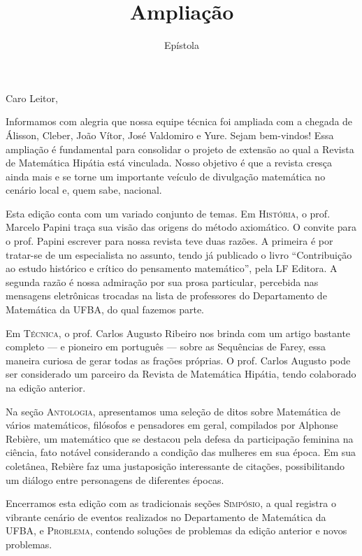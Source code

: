 \documentclass[onecolumn]{hipatia}
\title{Ampliação}
\subtitle{Epístola}
\author{}
\begin{document}
\setcounter{page}{\epistolapage}
\maketitle
\leftskip=2.5cm
\rightskip=2.5cm


\noindent Caro Leitor,
\vspace{1cm}


Informamos com alegria que nossa equipe técnica foi ampliada com a chegada de Álisson, Cleber, João Vítor, José Valdomiro e Yure. Sejam bem-vindos! Essa ampliação é fundamental para consolidar o projeto de extensão ao qual a Revista de Matemática Hipátia está vinculada. Nosso objetivo é que a revista cresça ainda mais e se torne um importante veículo de divulgação matemática no cenário local e, quem sabe, nacional.

Esta edição conta com um variado conjunto de temas. Em \textsc{História}, o prof. Marcelo Papini traça sua visão das origens do método axiomático. O convite para 
o prof. Papini escrever para nossa revista teve duas razões. A primeira é por
tratar-se de um especialista no assunto, tendo já publicado o livro ``Contribuição ao estudo histórico e crítico do pensamento matemático'', pela LF Editora.
A segunda razão é nossa admiração por sua prosa particular, 
percebida nas mensagens eletrônicas trocadas na lista de professores do Departamento
de Matemática da UFBA, do qual fazemos parte. 

Em \textsc{Técnica}, o prof. Carlos Augusto Ribeiro nos brinda com um 
artigo bastante completo --- e pioneiro em português --- sobre as Sequências de Farey, essa maneira 
curiosa de gerar todas as frações próprias. O prof. Carlos Augusto 
pode ser considerado um parceiro da Revista de Matemática Hipátia, tendo colaborado na edição anterior.

Na seção \textsc{Antologia}, apresentamos uma seleção de ditos 
sobre Matemática de vários matemáticos, filósofos e pensadores em geral, compilados por Alphonse Rebière, um matemático que 
se destacou pela defesa da participação feminina na ciência,
fato notável considerando a condição das mulheres em sua época. Em sua 
coletânea, Rebière faz uma 
justaposição interessante de citações, possibilitando um 
diálogo entre personagens de diferentes épocas.

Encerramos esta edição com as tradicionais seções \textsc{Simpósio},
a qual registra o vibrante cenário de eventos realizados no 
Departamento de Matemática da UFBA, e \textsc{Problema}, contendo
soluções de problemas da edição anterior e novos problemas.
\end{document}
